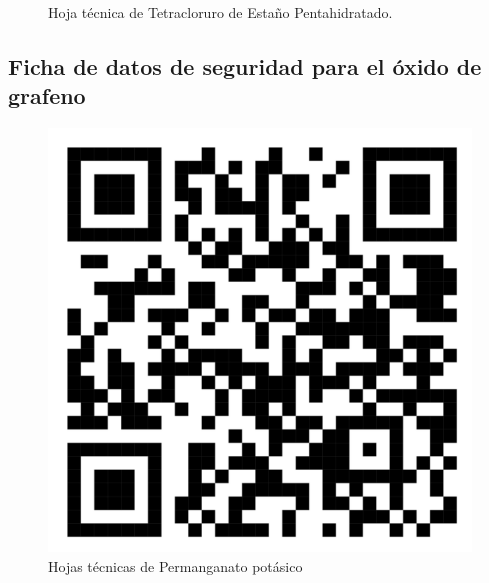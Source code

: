 \documentclass[12pt]{article}
\begin{document}
\begin{figure}[htbp]
\begin{minipage}{0.4\textwidth}
    \caption{Hoja técnica de Tetracloruro de Estaño Pentahidratado.}
    \label{fig:imagen2}
  \end{minipage}
\end{figure}

\subsection*{Ficha de datos de seguridad para el óxido de grafeno}
\begin{figure}[htbp]
  \begin{minipage}{0.4\textwidth}
    \centering
    \includegraphics[width=\linewidth]{Imagenes/399124_PermanganatoPotasio_hoja.png}
    \caption{Hojas técnicas de Permanganato potásico}
    \label{fig:imagen3}
  \end{minipage}\hfill
  \begin{minipage}{0.4\textwidth}
    \centering

\end{minipage}
\end{figure}
\end{document}
